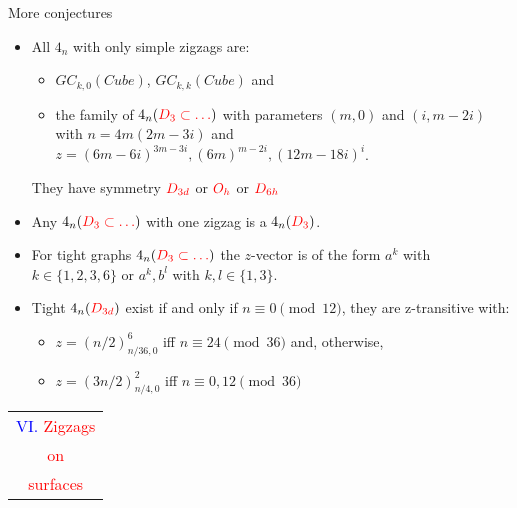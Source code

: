 \documentclass[%
pdf,
colorBG,
slideColor,
]{prosper}
\begin{document}
\begin{slide}{More conjectures}
\vspace{-4mm}


\begin{itemize}
\item All $4_n$ with only simple zigzags are:
\begin{itemize}
\item $GC_{k,0}(Cube)$, $GC_{k,k}(Cube)$ and
\item the family of $4_n(\textcolor{red}{D_3\subset\dots})$ with parameters $(m,0)$ and $(i, m-2i)$ with $n=4m(2m-3i)$ and
$z=(6m-6i)^{3m-3i}, (6m)^{m-2i}, (12m-18i)^i$.
\end{itemize}
They have symmetry $\textcolor{red}{D_{3d}}$ or $\textcolor{red}{O_{h}}$ or $\textcolor{red}{D_{6h}}$
\item Any $4_n(\textcolor{red}{D_{3}\subset\dots})$ with one zigzag is a $4_n(\textcolor{red}{D_3})$.
\item For tight graphs $4_n(\textcolor{red}{D_3\subset \dots})$ the $z$-vector is of the form $a^k$ with $k\in \{1, 2, 3, 6\}$ or $a^k, b^l$ with $k,l\in \{1, 3\}$.
\item Tight $4_n(\textcolor{red}{D_{3d}})$ exist if and only if $n\equiv 0\pmod {12}$, they are z-transitive with:
\begin{itemize}
\item $z=(n/2)^6_{n/36,0}$ iff $n\equiv 24\pmod {36}$ and, otherwise,
\item $z=(3n/2)^2_{n/4,0}$ iff $n\equiv 0,12\pmod {36}$
\end{itemize}

\end{itemize}

\end{slide}
























\begin{slide}{}
\begin{center}
{\Huge 
\begin{tabular*}{5.4cm}{c}
\\[-0.5cm]
\textcolor{blue}{VI. }\textcolor{red}{Zigzags}\\
\textcolor{red}{on}\\
\textcolor{red}{surfaces}
\end{tabular*}
}
\end{center}
\end{slide}
\end{document}
